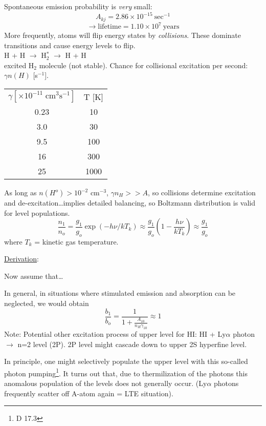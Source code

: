 \documentclass[12pt]{article}
\begin{document}
Spontaneous emission probability is \emph{very} small:
$${ A_{kj} = 2.86\times10^{-15}\:\mathrm{sec}^{-1}  }$$
$${ \rightarrow \mathrm{lifetime} = 1.10\times10^{7}\:\mathrm{years} }$$
More frequently, atoms will flip energy states by \emph{collisions}.
These dominate transitions and cause energy levels to flip.\\
{\centering H + H $\rightarrow$ H$_{2}^{*}$ $\rightarrow$ H + H}\\
excited H$_{2}$ molecule (not stable). Chance for collisional excitation
per second: $\gamma n(H)$ [s$^{-1}$].

\begin{center}
    \begin{tabular}{c c}
        $\gamma [\times10^{-11}\;\mathrm{cm}^{3}\mathrm{s}^{-1}]$ & T [K]\\
        0.23 & 10\\
        3.0 & 30\\
        9.5 & 100\\
        16 & 300\\
        25 & 1000
    \end{tabular}
\end{center}
As long as $n(H^{o}) > 10^{-2}$ cm$^{-3}$, $\gamma n_{H} >> A$, so
collisions determine excitation and de-excitation\ldots implies
detailed balancing, so Boltzmann distribution is valid for level
populations.
$${ \frac{n_{1}}{n_{o}} = \frac{g_{1}}{g_{o}}\exp(-h\nu/kT_{k})
    \approx \frac{g_{1}}{g_{o}}(1-\frac{h\nu}{kT_{k}}) \approx \frac{g_{1}}{g_{o}}
}$$
where $T_{k}$ = kinetic gas temperature.





\underline{Derivation}:

Now assume that\ldots

In general, in situations where stimulated emission and absorption can
be neglected, we would obtain
$${ \frac{b_{1}}{b_{o}} = \frac{1}{1 + \frac{A_{10}}{n_{H}\gamma_{10}}}
    \approx 1
}$$
Note: Potential other excitation process of upper level for HI:
HI + Ly$\alpha$ photon $\rightarrow$ n=2 level (2P). 2P level might cascade
down to upper 2S hyperfine level.

In principle, one might selectively populate the upper level with this
so-called photon pumping\footnote{D 17.3}.
It turns out that, due to thermilization of the photons this anomalous
population of the levels does not generally occur. (Ly$\alpha$ photons
frequently scatter off A-atom again = LTE situation).
\end{document}
